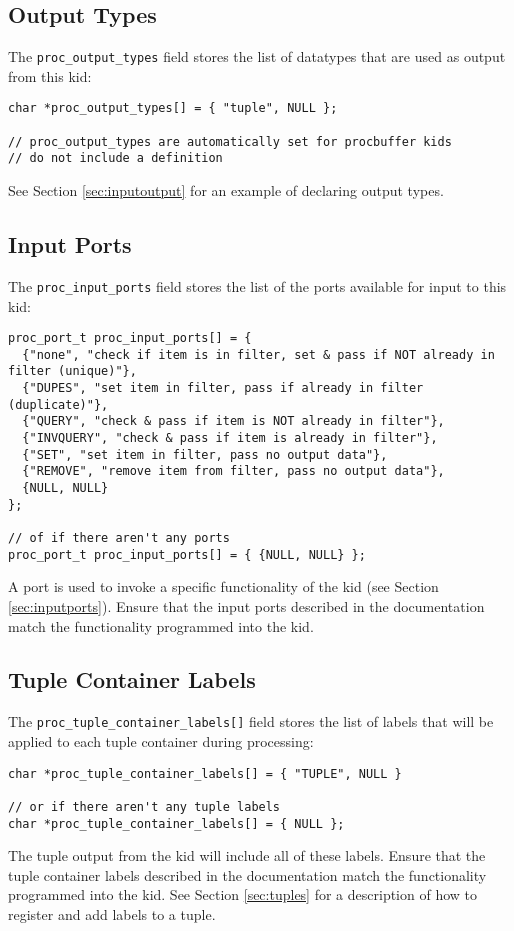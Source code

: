 \documentclass[11pt]{article}
\begin{document}
\subsection{Output Types}
The \texttt{proc\_output\_types} field stores the list of datatypes that are used as output from this kid:
\begin{lstlisting}
char *proc_output_types[] = { "tuple", NULL };

// proc_output_types are automatically set for procbuffer kids
// do not include a definition
\end{lstlisting}
See Section \ref{sec:inputoutput} for an example of declaring output types.

\subsection{Input Ports}
The \texttt{proc\_input\_ports} field stores the list of the ports available for input to this kid:
\begin{lstlisting}
proc_port_t proc_input_ports[] = {
  {"none", "check if item is in filter, set & pass if NOT already in filter (unique)"},
  {"DUPES", "set item in filter, pass if already in filter (duplicate)"},
  {"QUERY", "check & pass if item is NOT already in filter"},
  {"INVQUERY", "check & pass if item is already in filter"},
  {"SET", "set item in filter, pass no output data"},
  {"REMOVE", "remove item from filter, pass no output data"},
  {NULL, NULL}
};

// of if there aren't any ports
proc_port_t proc_input_ports[] = { {NULL, NULL} };
\end{lstlisting}
A port is used to invoke a specific functionality of the kid (see Section \ref{sec:inputports}). Ensure that the input
ports described in the documentation match the functionality programmed into the kid.

\subsection{Tuple Container Labels}
The \texttt{proc\_tuple\_container\_labels[]} field stores the list of labels that will be applied to each tuple
container during processing:
\begin{lstlisting}
char *proc_tuple_container_labels[] = { "TUPLE", NULL }

// or if there aren't any tuple labels
char *proc_tuple_container_labels[] = { NULL };
\end{lstlisting}
The tuple output from the kid will include all of these labels. Ensure that the tuple container labels described 
in the documentation match the functionality programmed into the kid. See Section \ref{sec:tuples} for a description 
of how to register and add labels to a tuple.
\end{document}
